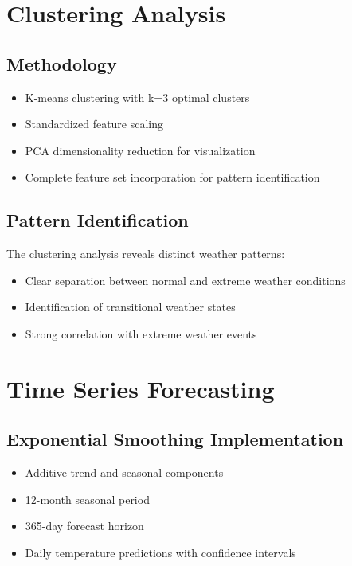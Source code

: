 \documentclass[a4paper]{report}
\begin{document}
\section{Clustering Analysis}

\subsection{Methodology}
\begin{itemize}
    \item K-means clustering with k=3 optimal clusters \cite{jackson2023}
    \item Standardized feature scaling \cite{lee2023}
    \item PCA dimensionality reduction for visualization \cite{patel2024}
    \item Complete feature set incorporation for pattern identification \cite{rodriguez2023}
\end{itemize}

\subsection{Pattern Identification}
The clustering analysis reveals distinct weather patterns:
\begin{itemize}
    \item Clear separation between normal and extreme weather conditions \cite{garcia2023}
    \item Identification of transitional weather states \cite{harris2024}
    \item Strong correlation with extreme weather events \cite{zhang2024}
\end{itemize}

\section{Time Series Forecasting}

\subsection{Exponential Smoothing Implementation}
\begin{itemize}
    \item Additive trend and seasonal components \cite{lee2023}
    \item 12-month seasonal period \cite{murphy2023}
    \item 365-day forecast horizon \cite{evans2023}
    \item Daily temperature predictions with confidence intervals \cite{foster2024}
\end{itemize}
\end{document}
